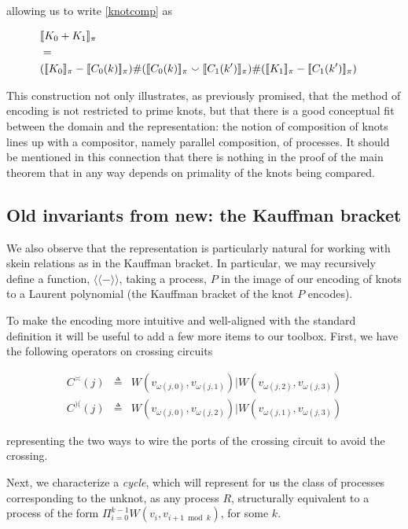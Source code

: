 \documentclass[]{llncs}
\begin{document}
allowing us to write \ref{knotcomp} as

\begin{eqnarray}
  & \meaningof{K_0 + K_1}_{\pi} & \nonumber \\
  & = & \nonumber \\
  & (\meaningof{K_0}_{\pi} - \meaningof{C_0(k)}_{\pi}) \# (\meaningof{C_0(k)}_{\pi} \smallsmile \meaningof{C_1(k')}_{\pi}) \# (\meaningof{K_1}_{\pi} - \meaningof{C_1(k')}_{\pi}) &
\end{eqnarray}

This construction not only illustrates, as previously promised, that
the method of encoding is not restricted to prime knots, but that
there is a good conceptual fit between the domain and the
representation: the notion of composition of knots lines up with a
compositor, namely parallel composition, of processes. It should be
mentioned in this connection that there is nothing in the proof of the
main theorem that in any way depends on primality of the knots being
compared.

\subsection{Old invariants from new: the Kauffman bracket}

We also observe that the representation is particularly natural for
working with skein relations as in the Kauffman bracket. In
particular, we may recursively define a function, $\langle\!\langle - \rangle\!\rangle$, taking a
process, $P$ in the image of our encoding of knots to a Laurent
polynomial (the Kauffman bracket of the knot $P$ encodes).

To make the encoding more intuitive and well-aligned with the standard
definition it will be useful to add a few more items to our toolbox. First, we have the following
operators on crossing circuits

\begin{eqnarray}
  C^{\asymp}(j) & \triangleq & W(v_{\omega(j,0)},v_{\omega(j,1)}) | W(v_{\omega(j,2)},v_{\omega(j,3)}) \nonumber \\
  C^{)(}(j) & \triangleq & W(v_{\omega(j,0)},v_{\omega(j,2)}) | W(v_{\omega(j,1)},v_{\omega(j,3)})
\end{eqnarray}

representing the two ways to wire the ports of the crossing circuit to avoid the crossing.

Next, we characterize a \emph{cycle}, which will represent for us the
class of processes corresponding to the unknot, as any process $R$,
structurally equivalent to a process of the form $\Pi_{i = 0}^{k-1}
W(v_i,v_{i+1 \bmod k})$, for some $k$.
\end{document}
